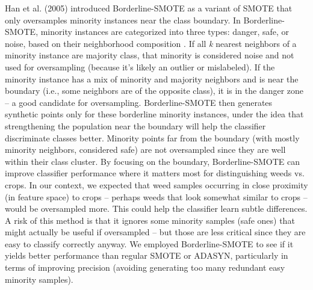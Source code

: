 \documentclass[agriengineering,article,submit,pdftex,moreauthors]{Definitions/mdpi}
\begin{document}
Han et al. (2005) introduced Borderline-SMOTE  as a variant of SMOTE that only oversamples minority instances near the class boundary. In Borderline-SMOTE, minority instances are categorized into three types: danger, safe, or noise, based on their neighborhood composition \cite{Han2005-ui}. If all \textit{k} nearest neighbors of a minority instance are majority class, that minority is considered noise and not used for oversampling (because it’s likely an outlier or mislabeled). If the minority instance has a mix of minority and majority neighbors and is near the boundary (i.e., some neighbors are of the opposite class), it is in the danger zone – a good candidate for oversampling. Borderline-SMOTE then generates synthetic points only for these borderline minority instances, under the idea that strengthening the population near the boundary will help the classifier discriminate classes better. Minority points far from the boundary (with mostly minority neighbors, considered safe) are not oversampled since they are well within their class cluster. By focusing on the boundary, Borderline-SMOTE can improve classifier performance where it matters most for distinguishing weeds vs. crops. In our context, we expected that weed samples occurring in close proximity (in feature space) to crops – perhaps weeds that look somewhat similar to crops – would be oversampled more. This could help the classifier learn subtle differences. A risk of this method is that it ignores some minority samples (safe ones) that might actually be useful if oversampled – but those are less critical since they are easy to classify correctly anyway. We employed Borderline-SMOTE to see if it yields better performance than regular SMOTE or ADASYN, particularly in terms of improving precision (avoiding generating too many redundant easy minority samples).
\end{document}
